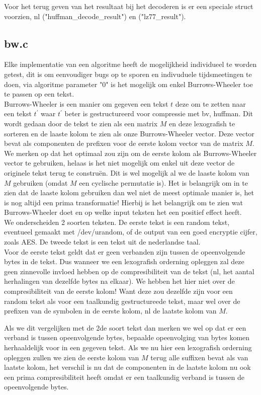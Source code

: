 \documentclass[10pt,a4paper]{report}
\begin{document}
Voor het terug geven van het resultaat bij het decoderen is er een speciale struct voorzien, nl ("huffman\_decode\_result") en ("lz77\_result"). 
\subsection*{bw.c}
Elke implementatie van een algoritme heeft de mogelijkheid individueel te worden getest, dit is om eenvoudiger bugs op te sporen en indivuduele tijdsmeetingen te doen, via algoritme parameter "0" is het mogelijk om enkel Burrows-Wheeler toe te passen op een tekst.\\

Burrows-Wheeler is een manier om gegeven een tekst $t$ deze om te zetten naar een tekst $t^{'}$ waar $t^{'}$ beter is gestructureerd voor compressie met bv, huffman. Dit wordt gedaan door de tekst te zien als een matrix $M$ en deze lexografish te sorteren en de laaste kolom te zien als onze Burrows-Wheeler vector. Deze vector bevat als componenten de prefixen voor de eerste kolom vector van de matrix $M$. We merken op dat het optimaal zou zijn om de eerste kolom als Burrows-Wheeler vector te gebruiken, helaas is het niet mogelijk om enkel uit deze vector de originele tekst terug te constru\"en. Dit is wel mogelijk al we de laaste kolom van $M$ gebruiken (omdat $M$ een cyclische permutatie is). Het is belangrijk om in te zien dat de laaste kolom gebruiken dan wel niet de meest optimale manier is, het is nog altijd een prima transformatie! Hierbij is het belangrijk om te zien wat Burrows-Wheeler doet en op welke input teksten het een positief effect heeft. \\

We onderscheiden 2 soorten teksten. De eerste tekst is een random tekst, eventueel gemaakt met /dev/urandom, of de output van een goed encryptie cijfer, zoals AES. De tweede tekst is een tekst uit de nederlandse taal. \\
Voor de eerste tekst geldt dat er geen verbanden zijn tussen de opeenvolgende bytes in de tekst. Dus wanneer we een lexografish orderning opleggen zal deze geen zinnevolle invloed hebben op de compresibiliteit van de tekst (nl, het aantal herhalingen van dezelfde bytes na elkaar). We hebben het hier niet over de compresibiliteit van de eerste kolom! Want deze zou dezelfde zijn voor een random tekst als voor een taalkundig gestructureede tekst, maar wel over de prefixen van de symbolen in de eerste kolom, nl de laatste kolom van $M$.

Als we dit vergelijken met de 2de soort tekst dan merken we wel op dat er een verband is tussen opeenvolgende bytes, bepaalde opeenvolging van bytes komen herhaaldelijk voor in een gegeven tekst. Als we nu hier een lexografish orderning opleggen zullen we zien de eerste kolom van $M$ terug alle suffixen bevat als van laatste kolom, het verschil is nu dat de componenten in de laatste kolom nu ook een prima compresibiliteit heeft omdat er een taalkundig verband is tussen de opeenvolgende bytes.
\end{document}
